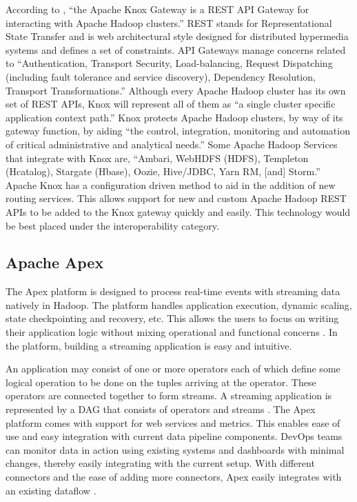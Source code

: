 {     According to \cite{knox}, ``the Apache Knox Gateway is a REST API
     Gateway for interacting with Apache Hadoop clusters.'' REST stands
     for Representational State Transfer and is web architectural
     style designed for distributed hypermedia systems and defines a
     set of constraints. \cite{fielding} API Gateways manage concerns
     related to ``Authentication, Transport Security, Load-balancing,
     Request Dispatching (including fault tolerance and service
     discovery), Dependency Resolution, Transport Transformations.''
     \cite{peyrott} Although every Apache Hadoop cluster has its own
     set of REST APIs, Knox will represent all of them as ``a single
     cluster specific application context path.'' \cite{knox} Knox
     protects Apache Hadoop clusters, by way of its gateway function,
     by aiding ``the control, integration, monitoring and automation of
     critical administrative and analytical needs.'' \cite{knox} Some
     Apache Hadoop Services that integrate with Knox are, ``Ambari,
     WebHDFS (HDFS), Templeton (Hcatalog), Stargate (Hbase), Oozie,
     Hive/JDBC, Yarn RM, [and] Storm.''  \cite{knox} Apache Knox has a
     configuration driven method to aid in the addition of new routing
     services. \cite{knox} This allows support for new and custom
     Apache Hadoop REST APIs to be added to the Knox gateway quickly
     and easily. \cite{knox} This technology would be best placed
     under the interoperability category.

\subsection{Apache Apex}

     The Apex platform is designed to process real-time events with
     streaming data natively in Hadoop. The platform handles
     application execution, dynamic scaling, state checkpointing and
     recovery, etc. This allows the users to focus on writing their
     application logic without mixing operational and functional
     concerns \cite{apache-apex}. In the platform, building a
     streaming application is easy and intuitive.

     An application may consist of one or more operators each of which
     define some logical operation to be done on the tuples arriving
     at the operator. These operators are connected together to form
     streams. A streaming application is represented by a DAG that
     consists of operators and streams \cite{apex-operators}. The
     Apex platform comes with support for web services and
     metrics. This enables ease of use and easy integration with
     current data pipeline components. DevOps teams can monitor data
     in action using existing systems and dashboards with minimal
     changes, thereby easily integrating with the current setup. With
     different connectors and the ease of adding more connectors, Apex
     easily integrates with an existing dataflow \cite{apex-ease}.

}
